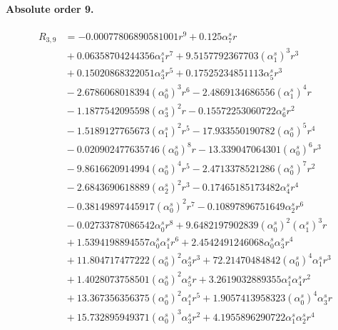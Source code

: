 \documentclass[10pt]{article}
\begin{document}
\paragraph{Absolute order 9.}
\begin{align*}
R_{3,9} &=  - 0.00077806890581001 r^{9} + 0.125 \alpha_{7}^s r \\
&{}  + 0.06358704244356 \alpha_{1}^s r^{7} + 9.5157792367703 \left(\alpha_{1}^s\right)^{3} r^{3} \\
&{}  + 0.15020868322051 \alpha_{3}^s r^{5} + 0.17525234851113 \alpha_{5}^s r^{3} \\
&{}  - 2.6786068018394 \left(\alpha_{0}^s\right)^{3} r^{6} - 2.4869134686556 \left(\alpha_{1}^s\right)^{4} r \\
&{}  - 1.1877542095598 \left(\alpha_{3}^s\right)^{2} r - 0.15572253060722 \alpha_{6}^s r^{2} \\
&{}  - 1.5189127765673 \left(\alpha_{1}^s\right)^{2} r^{5} - 17.933550190782 \left(\alpha_{0}^s\right)^{5} r^{4} \\
&{}  - 0.020902477635746 \left(\alpha_{0}^s\right)^{8} r - 13.339047064301 \left(\alpha_{0}^s\right)^{6} r^{3} \\
&{}  - 9.8616620914994 \left(\alpha_{0}^s\right)^{4} r^{5} - 2.4713378521286 \left(\alpha_{0}^s\right)^{7} r^{2} \\
&{}  - 2.6843690618889 \left(\alpha_{2}^s\right)^{2} r^{3} - 0.17465185173482 \alpha_{4}^s r^{4} \\
&{}  - 0.38149897445917 \left(\alpha_{0}^s\right)^{2} r^{7} - 0.10897896751649 \alpha_{2}^s r^{6} \\
&{}  - 0.02733787086542 \alpha_{0}^s r^{8} + 9.6482197902839 \left(\alpha_{0}^s\right)^{2} \left(\alpha_{1}^s\right)^{3} r \\
&{}  + 1.5394198894557 \alpha_{0}^s \alpha_{1}^s r^{6} + 2.4542491246068 \alpha_{0}^s \alpha_{3}^s r^{4} \\
&{}  + 11.804717477222 \left(\alpha_{0}^s\right)^{2} \alpha_{3}^s r^{3} + 72.21470484842 \left(\alpha_{0}^s\right)^{4} \alpha_{1}^s r^{3} \\
&{}  + 1.4028073758501 \left(\alpha_{0}^s\right)^{2} \alpha_{5}^s r + 3.2619032889355 \alpha_{1}^s \alpha_{4}^s r^{2} \\
&{}  + 13.367356356375 \left(\alpha_{0}^s\right)^{2} \alpha_{1}^s r^{5} + 1.9057413958323 \left(\alpha_{0}^s\right)^{4} \alpha_{3}^s r \\
&{}  + 15.732895949371 \left(\alpha_{0}^s\right)^{3} \alpha_{3}^s r^{2} + 4.1955896290722 \alpha_{1}^s \alpha_{2}^s r^{4} \\

\end{align*}
\end{document}
